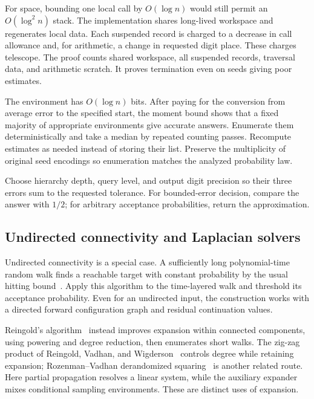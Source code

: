 \documentclass[11pt]{article}
\numberwithin{equation}{section}
\theoremstyle{definition}
\theoremstyle{remark}
\begin{document}
For space, bounding one local call by \(O(\log n)\) would still permit an \(O(\log^2 n)\) stack. The implementation shares long-lived workspace and regenerates local data. Each suspended record is charged to a decrease in call allowance and, for arithmetic, a change in requested digit place. These charges telescope. The proof counts shared workspace, all suspended records, traversal data, and arithmetic scratch. It proves termination even on seeds giving poor estimates.

The environment has \(O(\log n)\) bits. After paying for the conversion from average error to the specified start, the moment bound shows that a fixed majority of appropriate environments give accurate answers. Enumerate them deterministically and take a median by repeated counting passes. Recompute estimates as needed instead of storing their list. Preserve the multiplicity of original seed encodings so enumeration matches the analyzed probability law.

Choose hierarchy depth, query level, and output digit precision so their three errors sum to the requested tolerance. For bounded-error decision, compare the answer with \(1/2\); for arbitrary acceptance probabilities, return the approximation.

\subsection{Undirected connectivity and Laplacian solvers}

Undirected connectivity is a special case. A sufficiently long polynomial-time random walk finds a reachable target with constant probability by the usual hitting bound~\cite{AleliunasKLLR1979}. Apply this algorithm to the time-layered walk and threshold its acceptance probability. Even for an undirected input, the construction works with a directed forward configuration graph and residual continuation values.

Reingold's algorithm~\cite{Reingold2008} instead improves expansion within connected components, using powering and degree reduction, then enumerates short walks. The zig-zag product of Reingold, Vadhan, and Wigderson~\cite{ReingoldVadhanWigderson2002} controls degree while retaining expansion; Rozenman--Vadhan derandomized squaring~\cite{RozenmanVadhan2005} is another related route. Here partial propagation resolves a linear system, while the auxiliary expander mixes conditional sampling environments. These are distinct uses of expansion.
\end{document}
